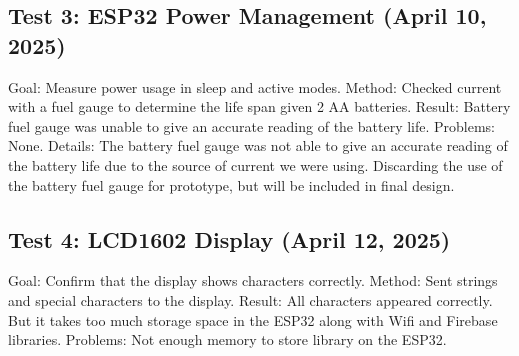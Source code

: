 \documentclass{article}
\begin{document}
\subsection*{Test 3: ESP32 Power Management (April 10, 2025)}
Goal: Measure power usage in sleep and active modes.
Method: Checked current with a fuel gauge to determine the life span given 2 AA batteries.
Result: Battery fuel gauge was unable to give an accurate reading of the battery life.
Problems: None.
Details: The battery fuel gauge was not able to give an accurate reading of the battery life due to the source of current we were using. Discarding the use of the battery fuel gauge for prototype, but will be included in final design.

\subsection*{Test 4: LCD1602 Display (April 12, 2025)}
Goal: Confirm that the display shows characters correctly.
Method: Sent strings and special characters to the display.
Result: All characters appeared correctly. But it takes too much storage space in the ESP32 along with Wifi and Firebase libraries.
Problems: Not enough memory to store library on the ESP32.
\end{document}
